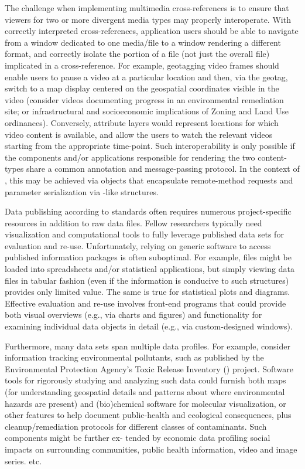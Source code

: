 \documentclass[11pt]{article}
\begin{document}
{{\begin{description}
\pseudoIndent{}  The challenge when implementing multimedia cross-references is to 
ensure that viewers for two or more divergent media types may properly 
interoperate.  With correctly interpreted cross-references, application users should be able 
to navigate from a window dedicated to one media/file to a 
window rendering a different format, and correctly isolate the 
portion of a file (not just the overall file) implicated in a cross-reference.  
For example, geotagging video frames should enable users to pause a video 
at a particular location and then, via the geotag, switch to a map 
display centered on the geospatial coordinates visible in the video 
(consider videos documenting progress in an environmental 
remediation site; or infrastructural and socioeconomic implications of 
Zoning and Land Use ordinances).  Conversely, \GIS{} attribute layers would represent 
locations for which video content is available, and allow the users 
to watch the relevant videos starting from the appropriate time-point.  
Such interoperability is only possible if the components and/or applications 
responsible for rendering the two content-types share a common 
annotation and message-passing protocol.  In the context of \PacTk{}, 
this may be achieved via \TSOM{}  objects that encapsulate 
remote-method requests and parameter serialization via 
\TagML{}-like structures.
 

\item[Science and Humanities GUIs]   Data publishing 
according to \FAIRsharing{} standards often requires 
numerous project-specific resources in addition 
to raw data files.  Fellow researchers typically 
need visualization and computational tools to 
fully leverage published data sets for 
evaluation and re-use.  Unfortunately, relying on generic 
software to access published information packages is often 
suboptimal.  For example, \CSV{} files might be 
loaded into spreadsheets and/or statistical applications, 
but simply viewing data files in tabular fashion 
(even if the information is conducive to such structures) 
provides only limited value.  The same is true for 
statistical plots and diagrams.  Effective evaluation 
and re-use involves front-end programs that could provide 
both visual overviews (e.g., via charts and figures) 
and functionality for examining individual data objects 
in detail (e.g., via custom-designed \GUI{} windows).

\pseudoIndent{}  Furthermore, many data sets span multiple 
data profiles.  For example, consider information 
tracking environmental pollutants, such as published 
by the Environmental Protection Agency's 
Toxic Release Inventory (\TRI{}) project.
Software tools for rigorously studying and analyzing such data could 
furnish both \GIS{} maps (for understanding 
geospatial details and patterns about where environmental 
hazards are present) and (bio)chemical software 
for molecular visualization, or other features to 
help document public-health and eco\-logical 
consequences, plus cleanup/remediation protocols for 
different classes of contaminants.  Such components 
might be further ex- tended by economic data 
profiling social impacts on surrounding communities, 
public health information, video and image series. etc.


\end{description}}}
\end{document}

